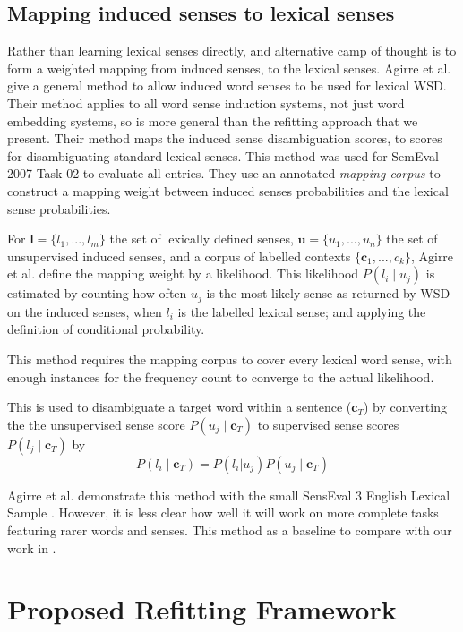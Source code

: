 \documentclass{sig-alternate}
\renewcommand{\c}{\mathbf{c}}
\renewcommand{\l}{\mathbf{l}}
\renewcommand{\u}{\mathbf{u}}
\begin{document}
\subsection{Mapping induced senses to lexical senses}\label{mapping}
Rather than learning lexical senses directly, and alternative camp of thought is to form a weighted mapping from induced senses, to the lexical senses.
 Agirre et al. \parencite{agirre2006} give a general method to allow induced word senses to be used for lexical WSD.
Their method applies to all word sense induction systems, not just word embedding systems, so is more general than the refitting approach that we present.
Their method maps the induced sense disambiguation scores, to scores for disambiguating standard lexical senses. This method was used for SemEval-2007 Task 02 \parencite{SemEval2007WSIandWSD} to evaluate all entries.
They use an annotated \emph{mapping corpus} to construct a mapping weight between induced senses probabilities and the lexical sense probabilities.

For $\l=\{l_1,..., l_m\}$ the set of lexically defined senses, $\u=\{u_1,...,u_n\}$ the set of unsupervised induced senses, and a corpus of labelled contexts $\{\c_1, ...,c_k\}$, Agirre et al. define the mapping weight by a likelihood.
This likelihood $P(l_i \mid u_j)$ is estimated by counting how often $u_j$ is the most-likely sense as returned by WSD on the induced senses, when $l_i$ is the labelled lexical sense; and applying the definition of conditional probability.

This method requires the mapping corpus to cover every lexical word sense, with enough instances for the frequency count to converge to the actual likelihood.

This is used to disambiguate a target word within a sentence ($\c_T$)  by converting the the unsupervised sense score $P(u_j \mid \c_T)$ to supervised sense scores $P(l_j \mid \c_T)$ by
\begin{equation} \label{eq:agireewsd}
P(l_i \mid \c_T) = P(l_i | u_j) P(u_j \mid \c_T)
\end{equation}


Agirre et al. demonstrate this method with the small SensEval 3 English Lexical Sample \parencite{mihalcea2004senseval}. However, it is less clear how well it will work on more complete tasks featuring rarer words and senses. 
This method as a baseline to compare with our work in .


\section{Proposed Refitting Framework} \label{refitting} \label{Framework}
\end{document}
